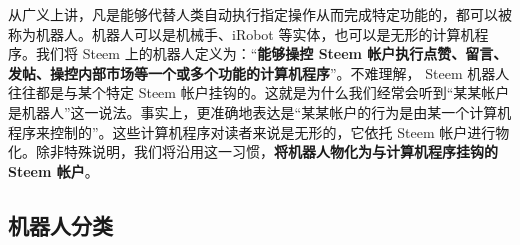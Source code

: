 \documentclass[]{ctexbook}
\begin{document}
从广义上讲，凡是能够代替人类自动执行指定操作从而完成特定功能的，都可以被称为机器人。机器人可以是机械手、iRobot 等实体，也可以是无形的计算机程序。我们将 Steem 上的机器人定义为：``\textbf{能够操控 Steem 帐户执行点赞、留言、发帖、操控内部市场等一个或多个功能的计算机程序}''。不难理解， Steem 机器人往往都是与某个特定 Steem 帐户挂钩的。这就是为什么我们经常会听到``某某帐户是机器人''这一说法。事实上，更准确地表达是``某某帐户的行为是由某一个计算机程序来控制的''。这些计算机程序对读者来说是无形的，它依托 Steem 帐户进行物化。除非特殊说明，我们将沿用这一习惯，\textbf{将机器人物化为与计算机程序挂钩的 Steem 帐户}。

\hypertarget{jqrfl}{%
\subsection{机器人分类}\label{jqrfl}}
\end{document}
